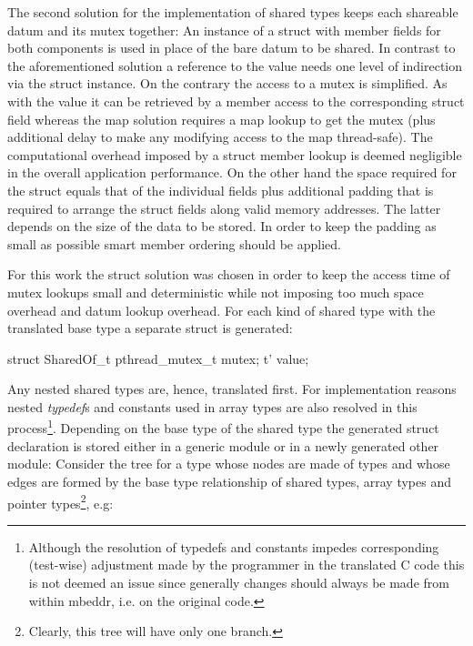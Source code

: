 The second solution for the implementation of shared types keeps each shareable datum and its mutex together: An instance of a struct with member fields for both components is used in place of the bare datum to be shared. In contrast to the aforementioned solution a reference to the value  needs one level of indirection via the struct instance. On the contrary the access to a mutex is simplified. As with the value it can be retrieved by a member access to the corresponding struct field whereas the map solution requires a map lookup to get the mutex (plus additional delay to make any modifying access to the map thread-safe). The computational overhead imposed by a struct member lookup is deemed negligible in the overall application performance. On the other hand the space required for the struct equals that of the individual fields plus additional padding \cite[pp.~303 ff.]{LinuxSystemProgramming} that is required to arrange the struct fields along valid memory addresses. The latter depends on the size of the data to be stored. In order to keep the padding as small as possible smart member ordering should be applied. 

For this work the struct solution was chosen in order to keep the access time of mutex lookups small and deterministic while not imposing too much space overhead and datum lookup overhead. For each kind of shared type  with the translated base type  a separate struct is generated:
\begin{ccode}
struct SharedOf_t {
  pthread_mutex_t mutex;
  t' value;
}
\end{ccode}
Any nested shared types are, hence, translated first. For implementation reasons nested \textit{typedef}s and constants used in array types are also resolved in this process\footnote{Although the resolution of typedefs and constants impedes corresponding (test-wise) adjustment made by the programmer in the translated C code this is not deemed an issue since generally changes should always be made from within mbeddr, i.e. on the original code.}. Depending on the base type of the shared type the generated struct declaration is stored either in a generic module or in a newly generated other module: Consider the tree for a type  whose nodes are made of types and whose edges are formed by the base type relationship of shared types, array types and pointer types\footnote{Clearly, this tree will have only one branch.}, e.g: 


